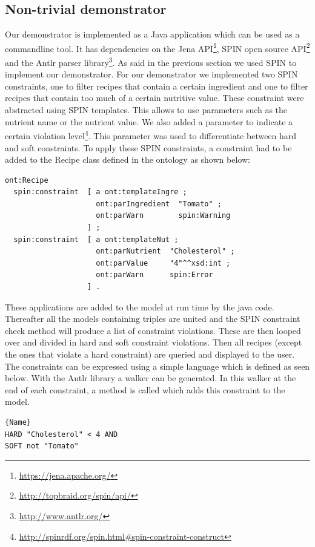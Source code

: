\subsection{Non-trivial demonstrator}
Our demonstrator is implemented as a Java application which can be used as a commandline tool. It has dependencies on the Jena API\footnote{\url{https://jena.apache.org/}}, SPIN open source API\footnote{\url{http://topbraid.org/spin/api/}} and the Antlr parser library\footnote{\url{http://www.antlr.org/}}. As said in the previous section we used SPIN to implement our demonstrator. For our demonstrator we implemented two SPIN constraints, one to filter recipes that contain a certain ingredient and one to filter recipes that contain too much of a certain nutritive value. These constraint were abstracted using SPIN templates. This allows to use parameters such as the nutrient name or the nutrient value. We also added a parameter to indicate a certain violation level\footnote{\url{http://spinrdf.org/spin.html\#spin-constraint-construct}}. This parameter was used to differentiate between hard and soft constraints. To apply these SPIN constraints, a constraint had to be added to the Recipe class defined in the ontology as shown below:
\begin{lstlisting}[caption=Example of applying constraints in turtle]
ont:Recipe  
  spin:constraint  [ a ont:templateIngre ;
                     ont:parIngredient  "Tomato" ;
                     ont:parWarn        spin:Warning
                   ] ;
  spin:constraint  [ a ont:templateNut ;
                     ont:parNutrient  "Cholesterol" ;
                     ont:parValue     "4"^^xsd:int ;
                     ont:parWarn      spin:Error
                   ] .
\end{lstlisting} 
These applications are added to the model at run time by the java code. Thereafter all the models containing triples are united and the SPIN constraint check method will produce a list of constraint violations. These are then looped over and divided in hard and soft constraint violations. Then all recipes (except the ones that violate a hard constraint) are queried and displayed to the user.\\
The constraints can be expressed using a simple language which is defined as seen below. With the Antlr library a walker can be generated. In this walker at the end of each constraint, a method is called which adds this constraint to the model. 
\begin{lstlisting}[caption=Example of the constraints file]{Name}
HARD "Cholesterol" < 4 AND
SOFT not "Tomato" 
\end{lstlisting}
